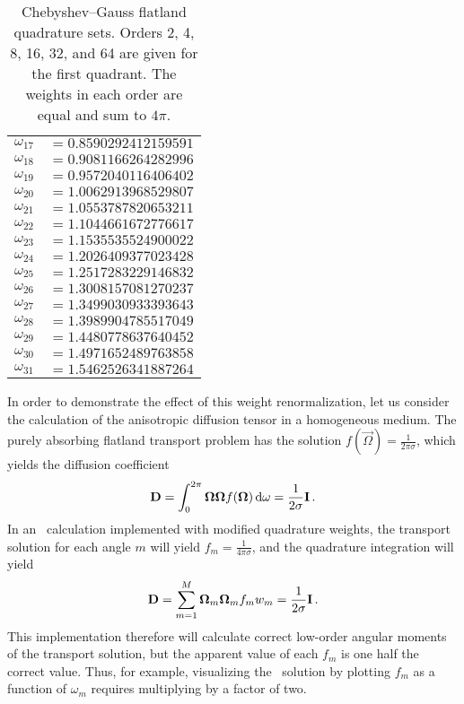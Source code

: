 \begin{table}[p]
\begin{minipage}[t]{3in}
\begin{tabular}{l@{}l}
$\omega_{17}$ & ${}=0.8590292412159591$ \\
$\omega_{18}$ & ${}=0.9081166264282996$ \\
$\omega_{19}$ & ${}=0.9572040116406402$ \\
$\omega_{20}$ & ${}=1.0062913968529807$ \\
$\omega_{21}$ & ${}=1.0553787820653211$ \\
$\omega_{22}$ & ${}=1.1044661672776617$ \\
$\omega_{23}$ & ${}=1.1535535524900022$ \\
$\omega_{24}$ & ${}=1.2026409377023428$ \\
$\omega_{25}$ & ${}=1.2517283229146832$ \\
$\omega_{26}$ & ${}=1.3008157081270237$ \\
$\omega_{27}$ & ${}=1.3499030933393643$ \\
$\omega_{28}$ & ${}=1.3989904785517049$ \\
$\omega_{29}$ & ${}=1.4480778637640452$ \\
$\omega_{30}$ & ${}=1.4971652489763858$ \\
$\omega_{31}$ & ${}=1.5462526341887264$ \\
\bottomrule
\end{tabular}%
\end{minipage}%
\caption[Chebyshev--Gauss flatland quadrature sets.]{Chebyshev--Gauss
  flatland quadrature sets. Orders 2, 4, 8, 16, 32, and 64 are given for the
  first quadrant. The weights in each order are equal and sum to $4\pi$.}
  \label{tab:chebyQs}
\end{table}

In order to demonstrate the effect of this weight renormalization, let us
consider the calculation of the anisotropic diffusion tensor
in a homogeneous medium.  The purely absorbing flatland transport problem has the
solution $f(\vec{\Omega}) = \frac{1}{2\pi\sigma}$, which yields the diffusion
coefficient
\begin{equation*}
  \mathbf{D} = \int_{0}^{2\pi} \bm{\Omega}\bm{\Omega} f(\bm{\Omega}) \mathop{}\!\mathrm{d} \omega
  = \frac{1}{2\sigma} \mathbf{I} \,.
\end{equation*}
In an \SN\ calculation implemented with modified quadrature weights, the
transport solution for each angle $m$ will yield $f_m = \frac{1}{4\pi\sigma}$,
and the quadrature integration will yield
\begin{equation*}
  \mathbf{D} = \sum_{m=1}^{M} \bm{\Omega}_m \bm{\Omega}_m f_m  w_m 
  = \frac{1}{2\sigma} \mathbf{I} \,.
\end{equation*}
This implementation therefore will calculate correct low-order angular moments of
the transport solution, but the apparent value of each $f_m$ is one half 
the correct value. Thus, for example, visualizing the \SN\
solution by plotting $f_m$ as a function of $\omega_m$ requires multiplying by a
factor of two.

